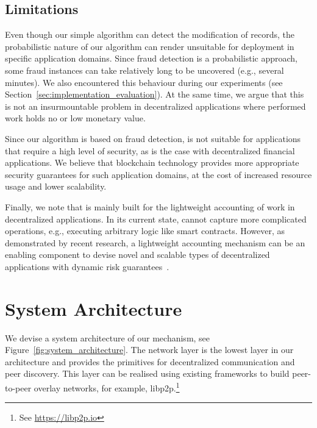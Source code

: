 \subsection{Limitations}
Even though our simple algorithm can detect the modification of records, the probabilistic nature of our algorithm can render \TrustChain{} unsuitable for deployment in specific application domains.
Since fraud detection is a probabilistic approach, some fraud instances can take relatively long to be uncovered (e.g., several minutes).
We also encountered this behaviour during our experiments (see Section~\ref{sec:implementation_evaluation}).
At the same time, we argue that this is not an insurmountable problem in decentralized applications where performed work holds no or low monetary value.

Since our algorithm is based on fraud detection, \TrustChain{} is not suitable for applications that require a high level of security, as is the case with decentralized financial applications.
We believe that blockchain technology provides more appropriate security guarantees for such application domains, at the cost of increased resource usage and lower scalability.

Finally, we note that \TrustChain{} is mainly built for the lightweight accounting of work in decentralized applications.
In its current state, \TrustChain{} cannot capture more complicated operations, e.g., executing arbitrary logic like smart contracts.
However, as demonstrated by recent research, a lightweight accounting mechanism can be an enabling component to devise novel and scalable types of decentralized applications with dynamic risk guarantees~\cite{de2021xchange,de2019devid,de2018real}.


\section{System Architecture}
\label{sec:system_architecture}
We devise a system architecture of our \TrustChain{} mechanism, see Figure~\ref{fig:system_architecture}.
The network layer is the lowest layer in our architecture and provides the primitives for decentralized communication and peer discovery.
This layer can be realised using existing frameworks to build peer-to-peer overlay networks, for example, libp2p.\footnote{See \url{https://libp2p.io}}

